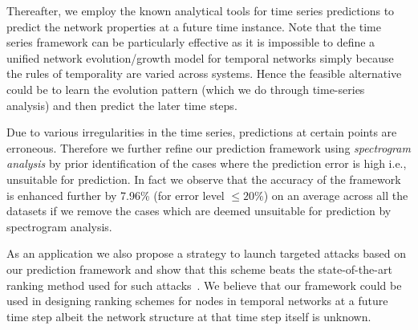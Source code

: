 Thereafter, we employ the known analytical tools for time series predictions to predict the network properties at a future time instance. 
Note that the time series framework can be particularly effective as it is impossible to 
define a unified network evolution/growth model for temporal networks simply because the  
rules of temporality are varied across systems. Hence the feasible alternative could be to learn 
the evolution pattern (which we do through time-series analysis) and then predict the later time steps. 

Due to various irregularities in the time series, predictions at certain points are erroneous. Therefore we 
further refine our prediction framework using {\em spectrogram analysis} by prior identification of the cases where the 
prediction error is high i.e., unsuitable for prediction. In fact we observe that the accuracy of the framework is 
enhanced further by 7.96\% (for error level $\leq 20\%$) on an average across all the datasets 
if we remove 
the cases which are deemed unsuitable for prediction by spectrogram analysis.

As an application we also propose a strategy to launch targeted attacks based on our prediction framework and show that this scheme beats the state-of-the-art ranking method 
used for such attacks~\cite{trajanovski2012error}. We believe that our framework could be used in designing ranking schemes for nodes in temporal networks at a future time step  
albeit the network structure at that time step itself is unknown.


